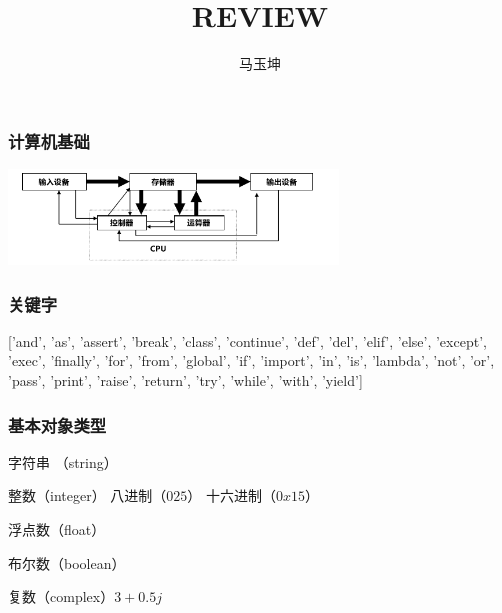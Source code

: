 \documentclass[5pt,a4paper,twocolumn]{article}
\title{REVIEW}
\author{马玉坤}
\date{}
\begin{document}
\subsubsection*{计算机基础}

\begin{center}
\includegraphics[height=1in]{computer_io.jpg}
\end{center}

\subsubsection*{关键字}
['and', 'as', 'assert', 'break', 'class', 'continue', 'def', 'del', 'elif', 'else', 'except', 'exec', 'finally', 'for', 'from', 'global', 'if', 'import', 'in', 'is', 'lambda', 'not', 'or', 'pass', 'print', 'raise', 'return', 'try', 'while', 'with', 'yield']

\subsubsection*{基本对象类型}
字符串 （string）

整数（integer） 八进制（$025$） 十六进制（$0x15$）

浮点数（float）

布尔数（boolean）

复数（complex）$3+0.5j$
\end{document}
